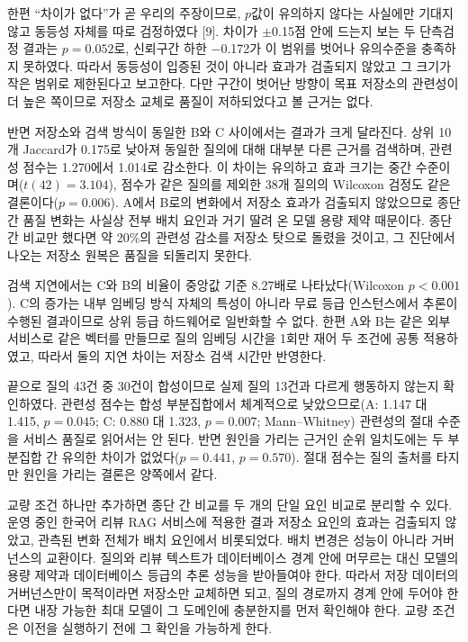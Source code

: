 \documentclass[10pt,a4paper,twocolumn]{article}
\newcommand{\pgsec}[1]{\par\vspace{5pt}{\bfseries\fontsize{12}{14}\selectfont #1}\par\nobreak\vspace{2pt}\nobreak}
\begin{document}
한편 ``차이가 없다''가 곧 우리의 주장이므로, $p$값이 유의하지 않다는 사실에만 기대지 않고 동등성 자체를 따로 검정하였다 [9]. 차이가 $\pm$0.15점 안에 드는지 보는 두 단측검정 결과는 $p = 0.052$로, 신뢰구간 하한 $-$0.172가 이 범위를 벗어나 유의수준을 충족하지 못하였다. 따라서 동등성이 입증된 것이 아니라 효과가 검출되지 않았고 그 크기가 작은 범위로 제한된다고 보고한다. 다만 구간이 벗어난 방향이 목표 저장소의 관련성이 더 높은 쪽이므로 저장소 교체로 품질이 저하되었다고 볼 근거는 없다.

반면 저장소와 검색 방식이 동일한 B와 C 사이에서는 결과가 크게 달라진다. 상위 10개 Jaccard가 0.175로 낮아져 동일한 질의에 대해 대부분 다른 근거를 검색하며, 관련성 점수는 1.270에서 1.014로 감소한다. 이 차이는 유의하고 효과 크기는 중간 수준이며($t(42) = 3.104$), 점수가 같은 질의를 제외한 38개 질의의 Wilcoxon 검정도 같은 결론이다($p = 0.006$). A에서 B로의 변화에서 저장소 효과가 검출되지 않았으므로 종단 간 품질 변화는 사실상 전부 배치 요인과 거기 딸려 온 모델 용량 제약 때문이다. 종단 간 비교만 했다면 약 20\%의 관련성 감소를 저장소 탓으로 돌렸을 것이고, 그 진단에서 나오는 저장소 원복은 품질을 되돌리지 못한다.

검색 지연에서는 C와 B의 비율이 중앙값 기준 8.27배로 나타났다(Wilcoxon $p < 0.001$). C의 증가는 내부 임베딩 방식 자체의 특성이 아니라 무료 등급 인스턴스에서 추론이 수행된 결과이므로 상위 등급 하드웨어로 일반화할 수 없다. 한편 A와 B는 같은 외부 서비스로 같은 벡터를 만들므로 질의 임베딩 시간을 1회만 재어 두 조건에 공통 적용하였고, 따라서 둘의 지연 차이는 저장소 검색 시간만 반영한다.

끝으로 질의 43건 중 30건이 합성이므로 실제 질의 13건과 다르게 행동하지 않는지 확인하였다. 관련성 점수는 합성 부분집합에서 체계적으로 낮았으므로(A: 1.147 대 1.415, $p = 0.045$; C: 0.880 대 1.323, $p = 0.007$; Mann--Whitney) 관련성의 절대 수준을 서비스 품질로 읽어서는 안 된다. 반면 원인을 가리는 근거인 순위 일치도에는 두 부분집합 간 유의한 차이가 없었다($p = 0.441$, $p = 0.570$). 절대 점수는 질의 출처를 타지만 원인을 가리는 결론은 양쪽에서 같다.

\pgsec{4. 결론}

교량 조건 하나만 추가하면 종단 간 비교를 두 개의 단일 요인 비교로 분리할 수 있다. 운영 중인 한국어 리뷰 RAG 서비스에 적용한 결과 저장소 요인의 효과는 검출되지 않았고, 관측된 변화 전체가 배치 요인에서 비롯되었다. 배치 변경은 성능이 아니라 거버넌스의 교환이다. 질의와 리뷰 텍스트가 데이터베이스 경계 안에 머무르는 대신 모델의 용량 제약과 데이터베이스 등급의 추론 성능을 받아들여야 한다. 따라서 저장 데이터의 거버넌스만이 목적이라면 저장소만 교체하면 되고, 질의 경로까지 경계 안에 두어야 한다면 내장 가능한 최대 모델이 그 도메인에 충분한지를 먼저 확인해야 한다. 교량 조건은 이전을 실행하기 전에 그 확인을 가능하게 한다.
\end{document}
